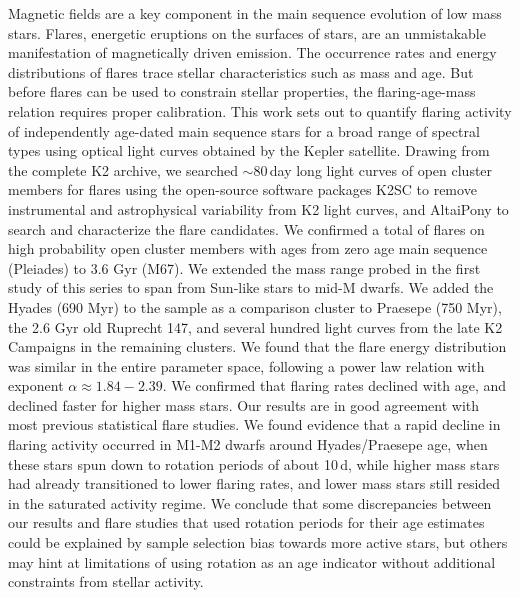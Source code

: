 \documentclass{aa}
\begin{document}
  \abstract
   {Magnetic fields are a key component in the main sequence evolution of low mass stars. Flares, energetic eruptions on the surfaces of stars, are an unmistakable manifestation of magnetically driven emission. The occurrence rates and energy distributions of flares trace stellar characteristics such as mass and age. But before flares can be used to constrain stellar properties, the flaring-age-mass relation requires proper calibration.}
   {This work sets out to quantify flaring activity of independently age-dated main sequence stars for a broad range of spectral types using optical light curves obtained by the Kepler satellite.}
   {Drawing from the complete K2 archive, we searched \unskip\;$\sim80$\,day long light curves of open cluster members for flares using the open-source software packages K2SC to remove instrumental and astrophysical variability from K2 light curves, and AltaiPony to search and characterize the flare candidates.}
   {We confirmed a total of flares on high probability open cluster members with ages from zero age main sequence (Pleiades) to 3.6 Gyr (M67). We extended the mass range probed in the first study of this series to span from Sun-like stars to mid-M dwarfs. We added the Hyades (690 Myr) to the sample as a comparison cluster to Praesepe (750 Myr), the 2.6 Gyr old Ruprecht 147, and several hundred light curves from the late K2 Campaigns in the remaining clusters. We found that the flare energy distribution was similar in the entire parameter space, following a power law relation with exponent $\alpha\approx 1.84-2.39$. }
{We confirmed that flaring rates declined with age, and declined faster for higher mass stars. Our results are in good agreement with most previous statistical flare studies. We found evidence that a rapid decline in flaring activity occurred in M1-M2 dwarfs around Hyades/Praesepe age, when these stars spun down to rotation periods of about 10\,d, while higher mass stars had already transitioned to lower flaring rates, and lower mass stars still resided in the saturated activity regime. We conclude that some discrepancies between our results and flare studies that used rotation periods for their age estimates could be explained by sample selection bias towards more active stars, but others may hint at limitations of using rotation as an age indicator without additional constraints from stellar activity.}
   \maketitle
   
\end{document}

